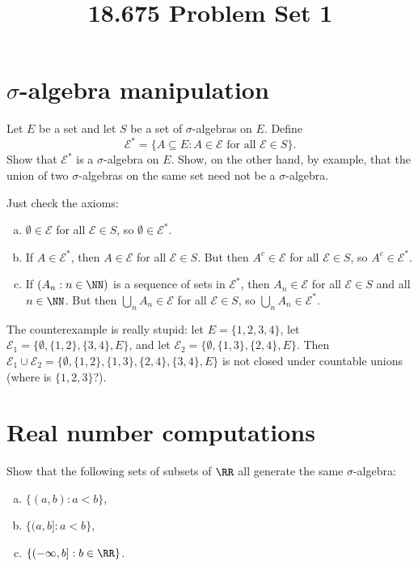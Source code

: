 \documentclass[11pt, headheight=30pt]{scrartcl}
\title{18.675 Problem Set 1}
\begin{document}
\section{$\sigma$-algebra manipulation}
\begin{prob}
    Let $E$ be a set and let $S$ be a set of $\sigma$-algebras on $E$. Define
    \[
        \mathcal{E}^* = \{A \subseteq E : A \in \mathcal{E} \text{ for all } \mathcal{E} \in S\}.
    \]
    Show that $\mathcal{E}^*$ is a $\sigma$-algebra on $E$.
    Show, on the other hand, by example, that the union
    of two $\sigma$-algebras on the same set need not be a $\sigma$-algebra.
\end{prob}

Just check the axioms:
\begin{enumerate}[(a)]
    \item $\emptyset \in \mathcal{E}$ for all $\mathcal{E} \in S$,
    so $\emptyset \in \mathcal{E}^*$.
    \item If $A \in \mathcal{E}^*$, then $A \in \mathcal{E}$
    for all $\mathcal{E} \in S$.
        But then $A^c \in \mathcal{E}$ for all $\mathcal{E} \in S$,
        so $A^c \in \mathcal{E}^*$.
    \item If $(A_n : n \in \NN)$ is a sequence of sets in $\mathcal{E}^*$, then
        $A_n \in \mathcal{E}$ for all $\mathcal{E} \in S$ and all $n \in \NN$.
        But then $\bigcup_n A_n \in \mathcal{E}$ for all $\mathcal{E} \in S$,
        so $\bigcup_n A_n \in \mathcal{E}^*$.
\end{enumerate}

The counterexample is really stupid: let $E = \{1,2,3,4\}$, let
$\mathcal{E}_1 = \{\emptyset, \{1,2\}, \{3,4\}, E\}$, and let
$\mathcal{E}_2 = \{\emptyset, \{1,3\}, \{2,4\}, E\}$. Then
$\mathcal{E}_1 \cup \mathcal{E}_2 = \{\emptyset, \{1,2\}, \{1,3\}, \{2,4\}, \{3,4\}, E\}$
is not closed under countable unions (where is $\{1,2,3\}$?).

\section{Real number computations}
\begin{prob}
    Show that the following sets of subsets of $\RR$ all generate
    the same $\sigma$-algebra:
    \begin{enumerate}[(a)]
        \item $\{(a, b) : a < b\}$,
        \item $\{(a, b] : a < b\}$,
        \item $\{(-\infty, b] : b \in \RR\}$.
    \end{enumerate}
\end{prob}
\end{document}

